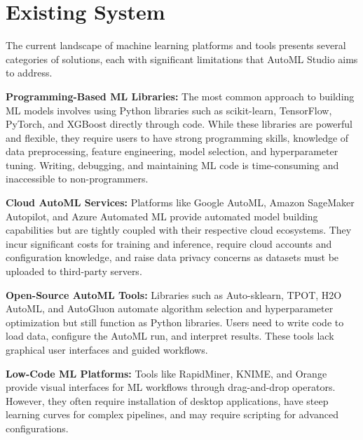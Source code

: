 \documentclass[12pt,a4paper]{report}
\begin{document}
\setcounter{chapter}{2}
\clearpage
\thispagestyle{empty}

\noindent
{}

\clearpage
{}
\setcounter{section}{0}
\section{Existing System}
The current landscape of machine learning platforms and tools presents several categories of solutions, each with significant limitations that AutoML Studio aims to address.

\textbf{Programming-Based ML Libraries:} The most common approach to building ML models involves using Python libraries such as scikit-learn, TensorFlow, PyTorch, and XGBoost directly through code. While these libraries are powerful and flexible, they require users to have strong programming skills, knowledge of data preprocessing, feature engineering, model selection, and hyperparameter tuning. Writing, debugging, and maintaining ML code is time-consuming and inaccessible to non-programmers.

\textbf{Cloud AutoML Services:} Platforms like Google AutoML, Amazon SageMaker Autopilot, and Azure Automated ML provide automated model building capabilities but are tightly coupled with their respective cloud ecosystems. They incur significant costs for training and inference, require cloud accounts and configuration knowledge, and raise data privacy concerns as datasets must be uploaded to third-party servers.

\textbf{Open-Source AutoML Tools:} Libraries such as Auto-sklearn, TPOT, H2O AutoML, and AutoGluon automate algorithm selection and hyperparameter optimization but still function as Python libraries. Users need to write code to load data, configure the AutoML run, and interpret results. These tools lack graphical user interfaces and guided workflows.

\textbf{Low-Code ML Platforms:} Tools like RapidMiner, KNIME, and Orange provide visual interfaces for ML workflows through drag-and-drop operators. However, they often require installation of desktop applications, have steep learning curves for complex pipelines, and may require scripting for advanced configurations.
\end{document}
